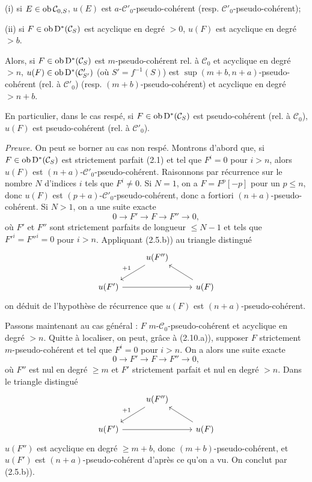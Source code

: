 \documentclass[11pt]{article}
\begin{document}
(i) si \(E\in\operatorname{ob}\mathcal C_{0,S}\), \(u(E)\) est \(a\)-\(\mathcal C'_0\)-pseudo-cohérent (resp. \(\mathcal C'_0\)-pseudo-cohérent);

(ii) si \(F\in\operatorname{ob}\mathrm D^*(\mathcal C_S)\) est acyclique en degré \(>0\), \(u(F)\) est acyclique en degré \(>b\).

Alors, si \(F\in\operatorname{ob}\mathrm D^*(\mathcal C_S)\) est \(m\)-pseudo-cohérent rel. à \(\mathcal C_0\) et acyclique en degré \(>n\), \(u(F)\in\operatorname{ob}\mathrm D^*(\mathcal C'_{S'})\) (où \(S'=f^{-1}(S)\)) est \(\sup(m+b,n+a)\)-pseudo-cohérent (rel. à \(\mathcal C'_0\)) (resp. \((m+b)\)-pseudo-cohérent) et acyclique en degré \(>n+b\).

En particulier, dans le cas respé, si \(F\in\operatorname{ob}\mathrm D^*(\mathcal C_S)\) est pseudo-cohérent (rel. à \(\mathcal C_0\)), \(u(F)\) est pseudo-cohérent (rel. à \(\mathcal C'_0\)).

\emph{Preuve.} On peut se borner au cas non respé. Montrons d'abord que, si \(F\in\operatorname{ob}\mathrm D^*(\mathcal C_S)\) est strictement parfait (2.1) et tel que \(F^i=0\) pour \(i>n\), alors \(u(F)\) est \((n+a)\)-\(\mathcal C'_0\)-pseudo-cohérent. Raisonnons par récurrence sur le nombre \(N\) d'indices \(i\) tels que \(F^i\neq0\). Si \(N=1\), on a \(F=F^p[-p]\)
pour un \(p\leq n\), donc \(u(F)\) est \((p+a)\)-\(\mathcal C'_0\)-pseudo-cohérent, donc a fortiori \((n+a)\)-pseudo-cohérent. Si \(N>1\), on a une suite exacte
\[
  0\longrightarrow F'\longrightarrow F\longrightarrow F''\longrightarrow 0,
\]
où \(F'\) et \(F''\) sont strictement parfaits de longueur \(\leq N-1\) et tels que \(F'^i=F''^i=0\) pour \(i>n\). Appliquant (2.5.b)) au triangle distingué
\[
\begin{tikzcd}
& u(F'') \arrow[dl,"+1"'] & \\
u(F') \arrow[rr] && u(F) \arrow[ul]
\end{tikzcd}
\]
on déduit de l'hypothèse de récurrence que \(u(F)\) est \((n+a)\)-pseudo-cohérent.

Passons maintenant au cas général : \(F\) \(m\)-\(\mathcal C_0\)-pseudo-cohérent et acyclique en degré \(>n\). Quitte à localiser, on peut, grâce à (2.10.a)), supposer \(F\) strictement \(m\)-pseudo-cohérent et tel que \(F^i=0\) pour \(i>n\). On a alors une suite exacte
\[
  0\longrightarrow F'\longrightarrow F\longrightarrow F''\longrightarrow 0,
\]
où \(F''\) est nul en degré \(\geq m\) et \(F'\) strictement parfait et nul en degré \(>n\). Dans le triangle distingué
\[
\begin{tikzcd}
& u(F'') \arrow[dl,"+1"'] & \\
u(F') \arrow[rr] && u(F) \arrow[ul]
\end{tikzcd}
\]
\(u(F'')\) est acyclique en degré \(\geq m+b\), donc \((m+b)\)-pseudo-cohérent, et \(u(F')\) est \((n+a)\)-pseudo-cohérent d'après ce qu'on a vu. On conclut par (2.5.b)).
\end{document}
